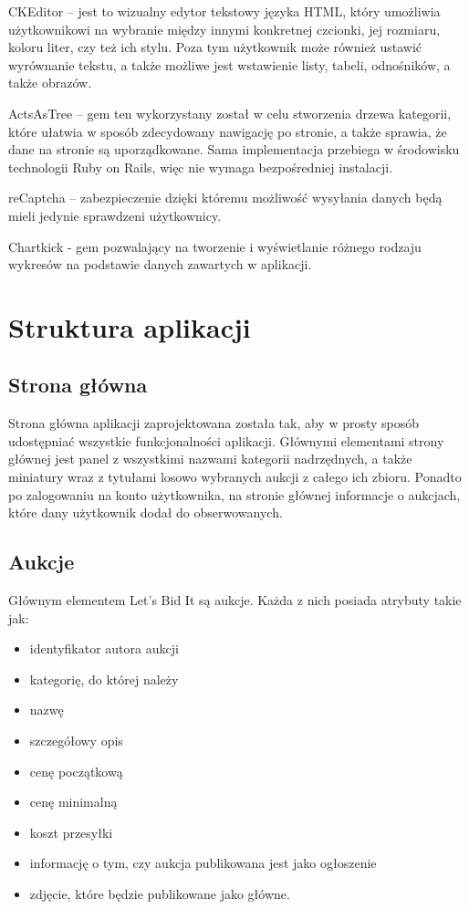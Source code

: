 \documentclass[brudnopis]{xmgr}
\begin{document}
CKEditor – jest to wizualny edytor tekstowy języka HTML, który umożliwia użytkownikowi na wybranie między innymi konkretnej 
czcionki, jej rozmiaru, koloru liter, czy też ich stylu. Poza tym użytkownik może również ustawić wyrównanie tekstu,
a także możliwe jest wstawienie listy, tabeli, odnośników, a także obrazów.

ActsAsTree – gem ten wykorzystany został w celu stworzenia drzewa kategorii, które ułatwia w sposób zdecydowany nawigację
po stronie, a także sprawia, że dane na stronie są uporządkowane. Sama implementacja przebiega w środowisku
technologii Ruby on Rails, więc nie wymaga bezpośredniej instalacji.

reCaptcha – zabezpieczenie dzięki któremu możliwość wysyłania danych będą mieli jedynie sprawdzeni użytkownicy.

Chartkick - gem pozwalający na tworzenie i wyświetlanie różnego rodzaju wykresów na podstawie danych zawartych w aplikacji.

\newpage

\section{Struktura aplikacji}

\subsection{Strona główna}

Strona główna aplikacji zaprojektowana została tak, aby w prosty sposób udostępniać wszystkie funkcjonalności aplikacji. Głównymi elementami strony głównej jest panel z wszystkimi nazwami kategorii nadrzędnych, a także miniatury wraz z tytułami losowo wybranych aukcji z całego ich zbioru. Ponadto po zalogowaniu na konto użytkownika, na stronie głównej informacje o aukcjach, które dany użytkownik dodał do obserwowanych.

\subsection{Aukcje}

Głównym elementem Let's Bid It są aukcje. Każda z nich posiada atrybuty takie jak:
\begin{itemize}

\item identyfikator autora aukcji
\item kategorię, do której należy
\item nazwę
\item szczegółowy opis
\item cenę początkową
\item cenę minimalną
\item koszt przesyłki
\item informację o tym, czy aukcja publikowana jest jako ogłoszenie
\item zdjęcie, które będzie publikowane jako główne.

\end{itemize}
\end{document}
